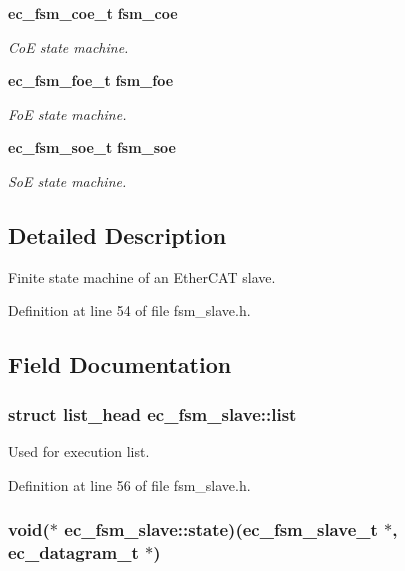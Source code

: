 \begin{DoxyCompactItemize}
{\bf ec\-\_\-fsm\-\_\-coe\-\_\-t} {\bf fsm\-\_\-coe}
\begin{DoxyCompactList}\small\item\em Co\-E state machine. \end{DoxyCompactList}\item 
{\bf ec\-\_\-fsm\-\_\-foe\-\_\-t} {\bf fsm\-\_\-foe}
\begin{DoxyCompactList}\small\item\em Fo\-E state machine. \end{DoxyCompactList}\item 
{\bf ec\-\_\-fsm\-\_\-soe\-\_\-t} {\bf fsm\-\_\-soe}
\begin{DoxyCompactList}\small\item\em So\-E state machine. \end{DoxyCompactList}\end{DoxyCompactItemize}


\subsection{Detailed Description}
Finite state machine of an Ether\-C\-A\-T slave. 

Definition at line 54 of file fsm\-\_\-slave.\-h.



\subsection{Field Documentation}
\subsubsection[{list}]{\setlength{\rightskip}{0pt plus 5cm}struct list\-\_\-head ec\-\_\-fsm\-\_\-slave\-::list}\label{structec__fsm__slave_ae393c328b5fe12f06f19f05fe140a643}


Used for execution list. 



Definition at line 56 of file fsm\-\_\-slave.\-h.

\subsubsection[{state}]{\setlength{\rightskip}{0pt plus 5cm}void($\ast$ ec\-\_\-fsm\-\_\-slave\-::state)({\bf ec\-\_\-fsm\-\_\-slave\-\_\-t} $\ast$, {\bf ec\-\_\-datagram\-\_\-t} $\ast$)}\label{structec__fsm__slave_a4e1432b74dca46446094400fff326c6f}


